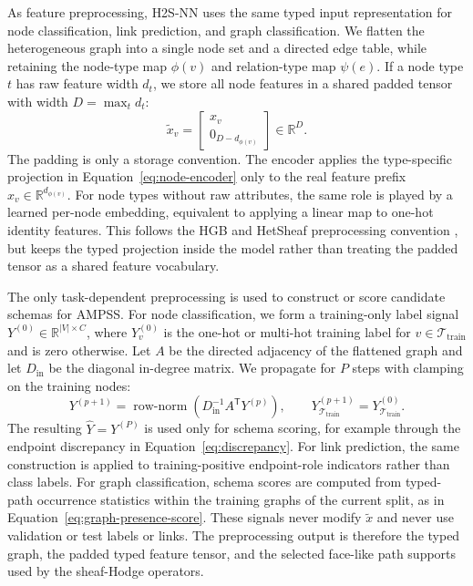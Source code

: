 \documentclass[sigconf,anonymous,review]{acmart}
\newcommand{\R}{\mathbb{R}}
\newcommand{\method}{\textsc{H2S-NN}}
\newcommand{\ampss}{\textsc{AMPSS}}
\newcommand{\transpose}{\mathsf{T}}
\begin{document}
As feature preprocessing, \method{} uses the same typed input representation for node classification, link prediction,
and graph classification.  We flatten the heterogeneous graph into a single node set and a
directed edge table, while retaining the node-type map \(\phi(v)\) and relation-type map
\(\psi(e)\).  If a node type \(t\) has raw feature width \(d_t\), we store all node features in a
shared padded tensor with width \(D=\max_t d_t\):
\begin{equation}
  \widetilde x_v
  =
  \begin{bmatrix}
    x_v \\ 0_{D-d_{\phi(v)}}
  \end{bmatrix}
  \in\R^D .
  \label{eq:typed-feature-padding}
\end{equation}
The padding is only a storage convention.  The encoder applies the type-specific projection in
Equation~\ref{eq:node-encoder} only to the real feature prefix \(x_v\in\R^{d_{\phi(v)}}\).  For
node types without raw attributes, the same role is played by a learned per-node embedding,
equivalent to applying a linear map to one-hot identity features.  This follows the HGB and
HetSheaf preprocessing convention \cite{lv2021hgb,braithwaite2024heterogeneous}, but keeps the
typed projection inside the model rather than treating the padded tensor as a shared feature
vocabulary.

The only task-dependent preprocessing is used to construct or score candidate schemas for
\ampss{}.  For node classification, we form a training-only label signal
\(Y^{(0)}\in\R^{|V|\times C}\), where \(Y^{(0)}_v\) is the one-hot or multi-hot training label for
\(v\in\mathcal{T}_{\mathrm{train}}\) and is zero otherwise.  Let \(A\) be the directed adjacency
of the flattened graph and let \(D_{\mathrm{in}}\) be the diagonal in-degree matrix.  We propagate
for \(P\) steps with clamping on the training nodes:
\begin{equation}
  Y^{(p+1)}
  =
  \operatorname{row\text{-}norm}
  \!\left(D_{\mathrm{in}}^{-1}A^{\transpose}Y^{(p)}\right),
  \qquad
  Y^{(p+1)}_{\mathcal{T}_{\mathrm{train}}}
  =
  Y^{(0)}_{\mathcal{T}_{\mathrm{train}}}.
  \label{eq:training-label-propagation}
\end{equation}
The resulting \(\widehat Y=Y^{(P)}\) is used only for schema scoring, for example through the
endpoint discrepancy in Equation~\ref{eq:discrepancy}.  For link prediction, the same construction
is applied to training-positive endpoint-role indicators rather than class labels.  For graph
classification, schema scores are computed from typed-path occurrence statistics within the
training graphs of the current split, as in Equation~\ref{eq:graph-presence-score}.  These
signals never modify \(\widetilde x\) and never use validation or test labels or links.  The
preprocessing output is therefore the typed graph, the padded typed feature tensor, and the
selected face-like path supports used by the sheaf-Hodge operators.
\end{document}
